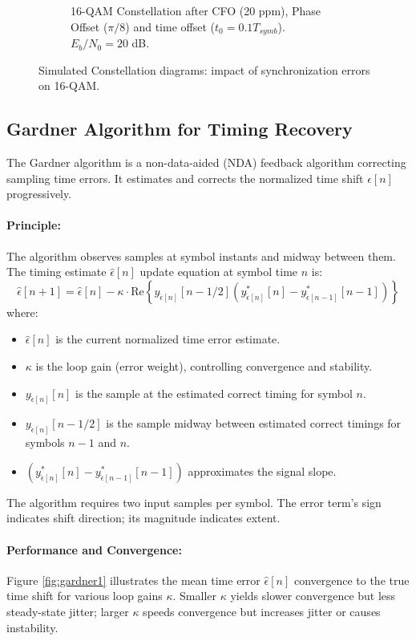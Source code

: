 \documentclass[11pt]{article}
\begin{document}
\begin{figure}[H]
\begin{subfigure}[b]{0.48\textwidth}
			\caption{16-QAM Constellation after CFO (20 ppm), Phase Offset ($\pi/8$) and time offset ($t_0 = 0.1 T_{symb}$). $E_b/N_0 = 20$ dB.}
			\label{fig:cfo-po-to-sub}
		\end{subfigure}
		\caption{Simulated Constellation diagrams: impact of synchronization errors on 16-QAM.}
		\label{fig:cfo-combined_style_change}
	\end{figure}
	
	\subsection{Gardner Algorithm for Timing Recovery}
	The Gardner algorithm is a non-data-aided (NDA) feedback algorithm correcting sampling time errors. It estimates and corrects the normalized time shift $\epsilon[n]$ progressively.
	
	\paragraph{Principle:}
	The algorithm observes samples at symbol instants and midway between them. The timing estimate $\hat{\epsilon}[n]$ update equation at symbol time $n$ is:
	\begin{equation}
		\hat{\epsilon}[n+1] = \hat{\epsilon}[n] - \kappa \cdot \text{Re} \left\{ y_{\hat{\epsilon}[n]}[n-1/2] \left( y_{\hat{\epsilon}[n]}^{*}[n] - y_{\hat{\epsilon}[n-1]}^{*}[n-1] \right) \right\}
		\label{eq:gardner_update_style_change}
	\end{equation}
	where:
	\begin{itemize}
		\item $\hat{\epsilon}[n]$ is the current normalized time error estimate.
		\item $\kappa$ is the loop gain (error weight), controlling convergence and stability.
		\item $y_{\hat{\epsilon}[n]}[n]$ is the sample at the estimated correct timing for symbol $n$.
		\item $y_{\hat{\epsilon}[n]}[n-1/2]$ is the sample midway between estimated correct timings for symbols $n-1$ and $n$.
		\item $(y_{\hat{\epsilon}[n]}^{*}[n] - y_{\hat{\epsilon}[n-1]}^{*}[n-1])$ approximates the signal slope.
	\end{itemize}
	The algorithm requires two input samples per symbol. The error term's sign indicates shift direction; its magnitude indicates extent.
	
	\paragraph{Performance and Convergence:}
	Figure \ref{fig:gardner1} illustrates the mean time error $\hat{\epsilon}[n]$ convergence to the true time shift for various loop gains $\kappa$. Smaller $\kappa$ yields slower convergence but less steady-state jitter; larger $\kappa$ speeds convergence but increases jitter or causes instability.
	
\end{document}

